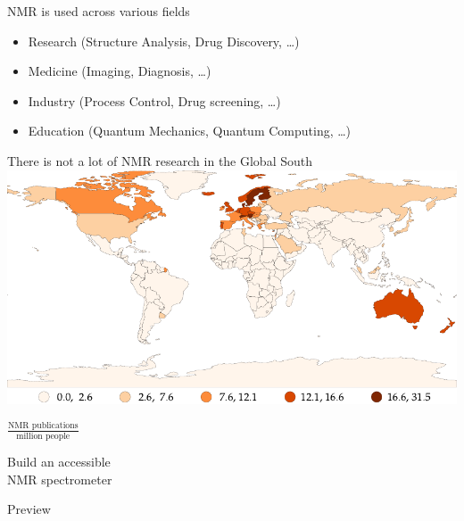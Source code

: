 \documentclass{ethpresentation}
\begin{document}
\begin{frame}{NMR is used across various fields}
  \begin{itemize}
    \item Research (Structure Analysis, Drug Discovery, \ldots)
    \item Medicine (Imaging, Diagnosis, \ldots)
    \item Industry (Process Control, Drug screening, \dots)
    \item Education (Quantum Mechanics, Quantum Computing, \ldots)
  \end{itemize}
\end{frame}

\begin{frame}{There is not a lot of NMR research in the Global South}
  \centering
  \includegraphics[height=0.8\textheight]{images/nmr-affiliations-per-million-people_naturalbreaks.pdf}

  \(\frac{\text{NMR publications}}{\text{million people}}\)
\end{frame}

\begin{frame}[standout]
  \centering
  Build an accessible\\NMR spectrometer
\end{frame}

\begin{frame}{Preview}
  \tableofcontents
\end{frame}
\end{document}
